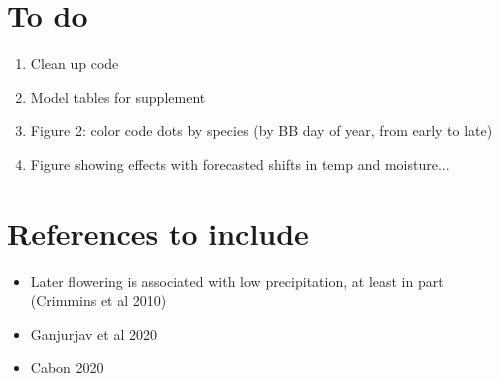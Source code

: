 \documentclass{article}
\begin{document}


\section* {To do}
\begin{enumerate}
\item Clean up code
\item Model tables for supplement
\item Figure 2: color code dots by species (by BB day of year, from early to late)
\item Figure showing effects with forecasted shifts in temp and moisture...

\end{enumerate}
\section*{References to include}
\begin{itemize}
\item Later flowering is  associated with low precipitation, at least in part (Crimmins et al 2010)
\item Ganjurjav et al 2020
\item Cabon 2020
\end{itemize}

\clearpage
\end{document}
